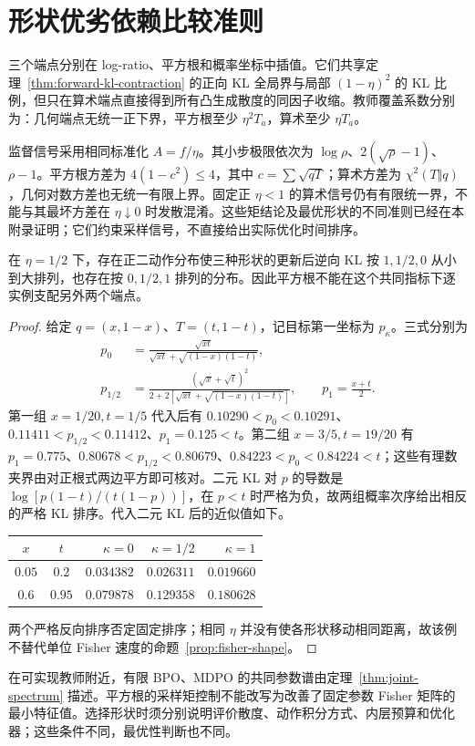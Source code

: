 \section{形状优劣依赖比较准则}
\label{sec:shape-criteria-summary}
三个端点分别在 log-ratio、平方根和概率坐标中插值。它们共享定理~\ref{thm:forward-kl-contraction} 的正向 KL 全局界与局部 $(1-\eta)^2$ 的 KL 比例，但只在算术端点直接得到所有凸生成散度的同因子收缩。教师覆盖系数分别为：几何端点无统一正下界，平方根至少 $\eta^2T_a$，算术至少 $\eta T_a$。

监督信号采用相同标准化 $A=f/\eta$。其小步极限依次为 $\log\rho$、$2(\sqrt\rho-1)$、$\rho-1$。平方根方差为 $4(1-c^2)\le4$，其中 $c=\sum\sqrt{qT}$；算术方差为 $\chi^2(T\Vert q)$，几何对数方差也无统一有限上界。固定正 $\eta<1$ 的算术信号仍有有限统一界，不能与其最坏方差在 $\eta\downarrow0$ 时发散混淆。这些矩结论及最优形状的不同准则已经在本附录证明；它们约束采样信号，不直接给出实际优化时间排序。

\begin{proposition}[共同 KL 指标不存在固定端点排序]
\label{prop:shape-order-counterexample}
在 $\eta=1/2$ 下，存在正二动作分布使三种形状的更新后逆向 KL 按 $1,1/2,0$ 从小到大排列，也存在按 $0,1/2,1$ 排列的分布。因此平方根不能在这个共同指标下逐实例支配另外两个端点。
\end{proposition}
\begin{proof}
给定 $q=(x,1-x)$、$T=(t,1-t)$，记目标第一坐标为 $p_\kappa$。三式分别为
\begin{align}
p_0&=\frac{\sqrt{xt}}{\sqrt{xt}+\sqrt{(1-x)(1-t)}},\\
p_{1/2}&=\frac{(\sqrt x+\sqrt t)^2}
{2+2[\sqrt{xt}+\sqrt{(1-x)(1-t)}]},\qquad p_1=\frac{x+t}{2}.
\end{align}
第一组 $x=1/20,t=1/5$ 代入后有 $0.10290<p_0<0.10291$、$0.11411<p_{1/2}<0.11412$、$p_1=0.125<t$。第二组 $x=3/5,t=19/20$ 有 $p_1=0.775$、$0.80678<p_{1/2}<0.80679$、$0.84223<p_0<0.84224<t$；这些有理数夹界由对正根式两边平方即可核对。二元 KL 对 $p$ 的导数是 $\log[p(1-t)/(t(1-p))]$，在 $p<t$ 时严格为负，故两组概率次序给出相反的严格 KL 排序。代入二元 KL 后的近似值如下。
\begin{center}
\begin{tabular}{ccrrr}
\toprule
$x$ & $t$ & $\kappa=0$ & $\kappa=1/2$ & $\kappa=1$\\
\midrule
$0.05$ & $0.2$ & $0.034382$ & $0.026311$ & $0.019660$\\
$0.6$ & $0.95$ & $0.079878$ & $0.129358$ & $0.180628$\\
\bottomrule
\end{tabular}
\end{center}
两个严格反向排序否定固定排序；相同 $\eta$ 并没有使各形状移动相同距离，故该例不替代单位 Fisher 速度的命题~\ref{prop:fisher-shape}。
\end{proof}

在可实现教师附近，有限 BPO、MDPO 的共同参数谱由定理~\ref{thm:joint-spectrum} 描述。平方根的采样矩控制不能改写为改善了固定参数 Fisher 矩阵的最小特征值。选择形状时须分别说明评价散度、动作积分方式、内层预算和优化器；这些条件不同，最优性判断也不同。

